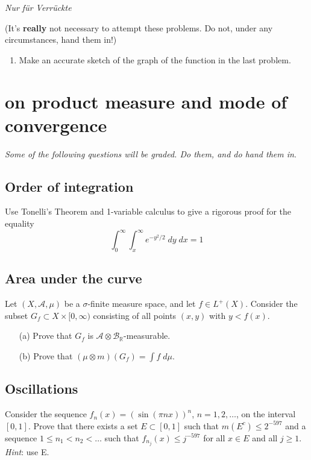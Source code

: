 \documentclass[lang=cn,11pt]{elegantbook}
\begin{document}
\begin{center}
  \textit{Nur f\"ur Verr\"uckte}
\end{center}
(It's \textbf{really} not necessary to attempt these problems. Do not, under any circumstances, hand them in!) 

\begin{enumerate}
    \item Make an accurate sketch of the graph of the function in the last problem.
\end{enumerate}






\chapter{on product measure and mode of convergence}
\begin{center}
\textit{Some of the following questions will be graded. Do them, and do hand them in}.
\end{center}

\section{Order of integration}
  Use Tonelli's Theorem and 1-variable calculus to give a rigorous proof for the equality
  \[
    \int_0^\infty\int_x^\infty e^{-y^2/2}\;d y \;d x=1
  \]





\section{Area under the curve}
  Let $(X,\mathcal{A},\mu)$ be a $\sigma$-finite measure space, and let $f\in L^+(X)$. Consider the subset  $G_f\subset X\times[0,\infty)$ consisting of all points $(x,y)$ with $y<f(x)$.
  \begin{itemize}
  \item[(a)]Prove that $G_f$ is $\mathcal{A}\otimes\mathcal{B}_\mathbb{R}$-measurable.
  \item[(b)]Prove that $(\mu\otimes m)(G_f)=\int f\; d\mu$.
  \end{itemize}  





\section{Oscillations}
  Consider the sequence $f_n(x)=(\sin(\pi n x))^n$, $n=1,2,\dots$, on the interval $[0,1]$. Prove that there exists a set $E\subset[0,1]$ such that $m(E^c)\le 2^{-597}$ and a sequence $1\le n_1<n_2<\dots$ such that $f_{n_j}(x)\le j^{-597}$ for all $x\in E$ and all $j\ge1$. \textit{Hint}: use E.
\end{document}
